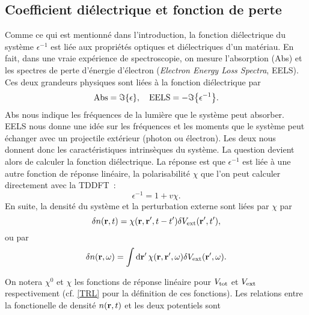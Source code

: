 \subsection{Coefficient diélectrique et fonction de perte}
\label{subsec-eels}
Comme ce qui est mentionné dans l'introduction,
la fonction diélectrique du système $\epsilon^{-1}$ est liée aux propriétés optiques et diélectriques d'un matériau.
En fait, dans une vraie expérience de spectroscopie,
on mesure l'absorption (Abs) et les spectres de perte d'énergie d'électron
(\textit{Electron Energy Loss Spectra}, EELS).
Ces deux grandeurs physiques sont liées à la fonction diélectrique par~\cite{Sottile2003}
\begin{equation*}
  \textnormal{Abs} = \imaginary\qty{\epsilon},
  \quad
  \textnormal{EELS} = -\imaginary\qty{\epsilon^{-1}}.
\end{equation*}
Abs nous indique les fréquences de la lumière que le système peut absorber.
EELS nous donne une idée sur les fréquences et les moments
que le système peut échanger avec un projectile extérieur (photon ou électron).
Les deux nous donnent donc les caractéristiques intrinsèques du système.
La question devient alors de calculer la fonction diélectrique. La réponse est que
$\epsilon^{-1}$ est liée à une autre fonction de réponse linéaire,
la polarisabilité $\chi$ que l'on peut calculer directement
avec la TDDFT~\cite{Martin2004, Sottile2003}:
\begin{equation}
  \label{epsilon}
  \epsilon^{-1} = 1+ v\chi.
\end{equation}
En suite, la densité du système et la perturbation externe sont liées par $\chi$ par
\begin{equation}
  \delta n(\vb{r}, t) = \chi(\vb{r}, \vb{r}', t-t')\delta V_{\textnormal{ext}}(\vb{r}', t'),
\end{equation}
ou par
\begin{equation}
  \delta n(\vb{r}, \omega) = \int\dd{\vb{r}'}\chi(\vb{r}, \vb{r}', \omega)\delta V_{\textnormal{ext}}(\vb{r}', \omega).
\end{equation}

On notera $\chi^0$ et $\chi$ les fonctions de réponse linéaire pour
$V_{\textnormal{tot}}$ et $V_{\textnormal{ext}}$ respectivement (cf. \cref{TRL} pour la définition de ces fonctions).
Les relations entre la fonctionelle de densité $n(\vb{r}, t)$ et les deux potentiels sont

